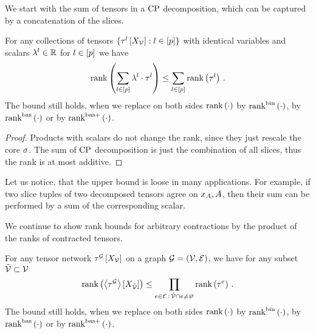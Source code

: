 
We start with the sum of tensors in a $\mathrm{CP}$ decomposition, which can be captured by a concatenation of the slices.

\begin{theorem}
    \label{the:CPrankSumBound}
    For any collections of tensors $\{\tau^{l}\left[X_{\mathcal{V}}\right] : l\in[p]\}$ with identical variables and scalars $\lambda^{l} \in \mathbb{R}$ for $l\in[p]$ we have
    \begin{align*}
        \mathrm{rank}\left(\sum_{l\in[p]} \lambda^{l} \cdot \tau^{l}\right) \leq \sum_{l\in[p]} \mathrm{rank}\left(\tau^{l}\right)  \, .
    \end{align*}
    The bound still holds, when we replace on both sides $\mathrm{rank}\left(\cdot\right)$ by $\mathrm{rank}^{\mathrm{bin}}\left(\cdot\right)$, by $\mathrm{rank}^{\mathrm{bas}}\left(\cdot\right)$ or by $\mathrm{rank}^{\mathrm{bas+}}\left(\cdot\right)$.
\end{theorem}
\begin{proof}
    Products with scalars do not change the rank, since they just rescale the core $\sigma$.
    The sum of $\mathrm{CP}$ decomposition is just the combination of all slices, thus the rank is at most additive.
\end{proof}

Let us notice, that the upper bound is loose in many applications.
For example, if two slice tuples of two decomposed tensors agree on $x_{A},A$, then their sum can be performed by a sum of the corresponding scalar.



We continue to show rank bounds for arbitrary contractions by the product of the ranks of contracted tensors.

\begin{theorem}
    \label{the:CPrankContractionBound}
    For any tensor network $\tau^{\mathcal{G}}\left[X_{\mathcal{V}}\right]$ on a graph $\mathcal{G}=(\mathcal{V},\mathcal{E})$, we have for any subset $\tilde{\mathcal{V}}\subset\mathcal{V}$
    \begin{align*}
        \mathrm{rank}\left(\left\langle \tau^{\mathcal{G}}\right\rangle \left[ X_{\tilde{\mathcal{V}}} \right]\right) \leq
        \prod_{e\in\mathcal{E} \, : \, \tilde{\mathcal{V}}\cap e \neq \varnothing} \mathrm{rank}\left(\tau^{e}\right) \, .
    \end{align*}
    The bound still holds, when we replace on both sides $\mathrm{rank}\left(\cdot\right)$ by $\mathrm{rank}^{\mathrm{bin}}\left(\cdot\right)$, by $\mathrm{rank}^{\mathrm{bas}}\left(\cdot\right)$ or by $\mathrm{rank}^{\mathrm{bas+}}\left(\cdot\right)$.
\end{theorem}

